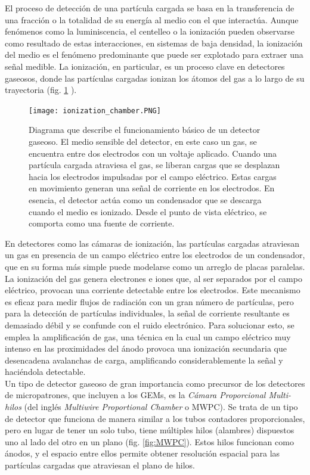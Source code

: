 \documentclass{article}
\begin{document}
\noindent El proceso de detección de una partícula cargada se basa en la transferencia de una fracción o la totalidad de su energía al medio con el que interactúa. Aunque fenómenos como la luminiscencia, el centelleo o la ionización pueden observarse como resultado de estas interacciones, en sistemas de baja densidad, la ionización del medio es el fenómeno predominante que puede ser explotado para extraer una señal medible. La ionización, en particular, es un proceso clave en detectores gaseosos, donde las partículas cargadas ionizan los átomos del gas a lo largo de su trayectoria (fig. \ref{fig:ionization_chamber} ).

\begin{figure}[H]
    \centering
    \texttt{[image: ionization\_chamber.PNG]}
    \caption{Diagrama que describe el funcionamiento básico de un detector gaseoso. El medio sensible del detector, en este caso un gas, se encuentra entre dos electrodos con un voltaje aplicado. Cuando una partícula cargada atraviesa el gas, se liberan cargas que se desplazan hacia los electrodos impulsadas por el campo eléctrico. Estas cargas en movimiento generan una señal de corriente en los electrodos. En esencia, el detector actúa como un condensador que se descarga cuando el medio es ionizado. Desde el punto de vista eléctrico, se comporta como una fuente de corriente.}
    \label{fig:ionization_chamber}
\end{figure}

\noindent En detectores como las cámaras de ionización, las partículas cargadas atraviesan un gas en presencia de un campo eléctrico entre los electrodos de un condensador, que en su forma más simple puede modelarse como un arreglo de placas paralelas. La ionización del gas genera electrones e iones que, al ser separados por el campo eléctrico, provocan una corriente detectable entre los electrodos. Este mecanismo es eficaz para medir flujos de radiación con un gran número de partículas, pero para la detección de partículas individuales, la señal de corriente resultante es demasiado débil y se confunde con el ruido electrónico. Para solucionar esto, se emplea la amplificación de gas, una técnica en la cual un campo eléctrico muy intenso en las proximidades del ánodo provoca una ionización secundaria que desencadena avalanchas de carga, amplificando considerablemente la señal y haciéndola detectable.\\



\noindent Un tipo de detector gaseoso de gran importancia como precursor de los detectores de micropatrones, que incluyen a los GEMs, es la \textit{Cámara Proporcional Multi-hilos} (del inglés \textit{Multiwire Proportional Chamber} o MWPC). Se trata de un tipo de detector que funciona de manera similar a los tubos contadores proporcionales, pero en lugar de tener un solo tubo, tiene múltiples hilos (alambres) dispuestos uno al lado del otro en un plano (fig. \ref{fig:MWPC}). Estos hilos funcionan como ánodos, y el espacio entre ellos permite obtener resolución espacial para las partículas cargadas que atraviesan el plano de hilos.
\end{document}
